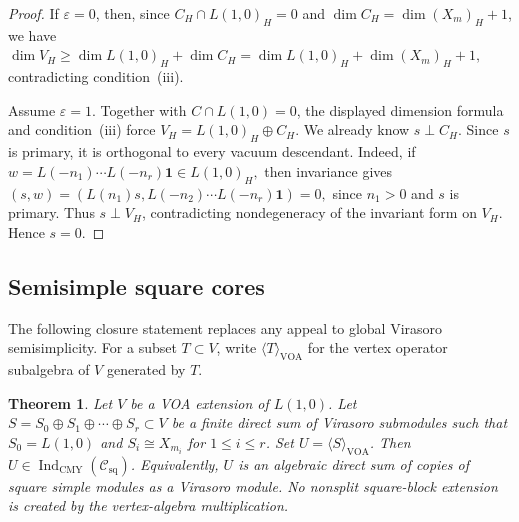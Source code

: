\documentclass[12pt,leqno]{amsart}
\numberwithin{equation}{section} \newtheorem{thm}{Theorem}[section] \newtheorem{lem}[thm]{Lemma} \newtheorem{ex}[thm]{Example} \newtheorem{prop}[thm]{Proposition} \newtheorem{cor}[thm]{Corollary} \newtheorem{defi}[thm]{Definition} \newtheorem{rmk}[thm]{Remark} \newtheorem{notation}[thm]{Notation}
\newcommand{\one}{\mathbf{1}}
\newcommand{\Csq}{\mathcal C_{\mathrm{sq}}}
\newcommand{\IndCMY}{\operatorname{Ind}_{\mathrm{CMY}}}
\begin{document}
\begin{proof}
If $\varepsilon=0$, then, since $C_H\cap L(1,0)_H=0$ and $\dim C_H=\dim(X_m)_H+1$, we have \(\dim V_H\ge\dim L(1,0)_H+\dim C_H=\dim L(1,0)_H+\dim(X_m)_H+1,\) contradicting condition~\textnormal{(iii)}.

Assume $\varepsilon=1$. Together with $C\cap L(1,0)=0$, the displayed dimension formula and condition~\textnormal{(iii)} force \(V_H=L(1,0)_H\oplus C_H.\) We already know $s\perp C_H$. Since $s$ is primary, it is orthogonal to every vacuum descendant. Indeed, if $ w=L(-n_1)\cdots L(-n_r)\one\in L(1,0)_H, $ then invariance gives $ (s,w) =(L(n_1)s,L(-n_2)\cdots L(-n_r)\one)=0, $ since $n_1>0$ and $s$ is primary. Thus $s\perp V_H$, contradicting nondegeneracy of the invariant form on $V_H$. Hence $s=0$.
\end{proof}

\subsection{Semisimple square cores}

The following closure statement replaces any appeal to global Virasoro semisimplicity. For a subset $T\subset V$, write \(\langle T\rangle_{\mathrm{VOA}}\) for the vertex operator subalgebra of $V$ generated by $T$.

\begin{thm}\label{thm:square-core}
Let $V$ be a VOA extension of $L(1,0)$. Let \(S=S_0\oplus S_1\oplus\cdots\oplus S_r\subset V\) be a finite direct sum of Virasoro submodules such that \(S_0=L(1,0)\) and \(S_i\cong X_{m_i}\) for \(1\le i\le r\). Set \(U=\langle S\rangle_{\mathrm{VOA}}\). Then \(U\in\IndCMY(\Csq)\). Equivalently, $U$ is an algebraic direct sum of copies of square simple modules as a Virasoro module. No nonsplit square-block extension is created by the vertex-algebra multiplication.
\end{thm}
\end{document}
